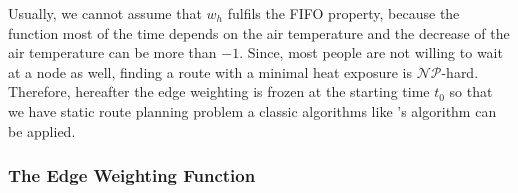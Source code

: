 Usually, we cannot assume that $w_h$ fulfils the FIFO property, because the function most of the time depends on the air temperature and the decrease of the air temperature can be more than $-1$. Since, most people are not willing to wait at a node as well, finding a route with a minimal heat exposure is $\mathcal{NP}$-hard. Therefore, 
hereafter the edge weighting is frozen at the starting time $t_0$ so that we have static route planning problem a classic algorithms like  \citeauthor{Dijkstra1959}'s algorithm \parencite{Dijkstra1959} can be applied. 

\subsubsection{The Edge Weighting Function}
 